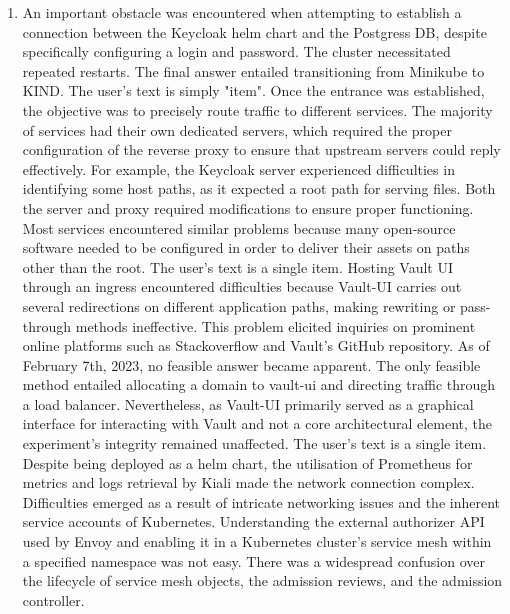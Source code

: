 \documentclass[journal]{IEEEtran}
\begin{document}
\begin{enumerate}[resume] 
  \item An important obstacle was encountered when attempting to establish a connection between the Keycloak helm chart and the Postgress DB, despite specifically configuring a login and password. The cluster necessitated repeated restarts. The final answer entailed transitioning from Minikube to KIND.
    The user's text is simply "item". Once the entrance was established, the objective was to precisely route traffic to different services. The majority of services had their own dedicated servers, which required the proper configuration of the reverse proxy to ensure that upstream servers could reply effectively. For example, the Keycloak server experienced difficulties in identifying some host paths, as it expected a root path for serving files. Both the server and proxy required modifications to ensure proper functioning. Most services encountered similar problems because many open-source software needed to be configured in order to deliver their assets on paths other than the root.
    The user's text is a single item. Hosting Vault UI through an ingress encountered difficulties because Vault-UI carries out several redirections on different application paths, making rewriting or pass-through methods ineffective. This problem elicited inquiries on prominent online platforms such as Stackoverflow and Vault's GitHub repository. As of February 7th, 2023, no feasible answer became apparent. The only feasible method entailed allocating a domain to vault-ui and directing traffic through a load balancer. Nevertheless, as Vault-UI primarily served as a graphical interface for interacting with Vault and not a core architectural element, the experiment's integrity remained unaffected.
    The user's text is a single item. Despite being deployed as a helm chart, the utilisation of Prometheus for metrics and logs retrieval by Kiali made the network connection complex. Difficulties emerged as a result of intricate networking issues and the inherent service accounts of Kubernetes. Understanding the external authorizer API used by Envoy and enabling it in a Kubernetes cluster's service mesh within a specified namespace was not easy. There was a widespread confusion over the lifecycle of service mesh objects, the admission reviews, and the admission controller.
\end{enumerate}
\end{document}
